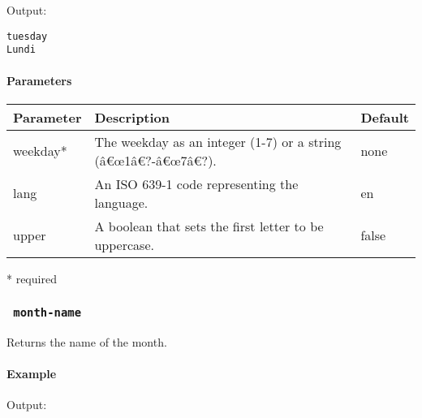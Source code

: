 Output:

\begin{verbatim}
tuesday
Lundi
\end{verbatim}

\paragraph{Parameters}\label{parameters}

\begin{Shaded}
\begin{Highlighting}[]
\end{Highlighting}
\end{Shaded}

\begin{longtable}[]{@{}lll@{}}
\toprule\noalign{}
Parameter & Description & Default \\
\midrule\noalign{}
\endhead
\bottomrule\noalign{}
\endlastfoot
weekday* & The weekday as an integer (1-7) or a string
(â€œ1â€?-â€œ7â€?). & none \\
lang & An ISO 639-1 code representing the language. & en \\
upper & A boolean that sets the first letter to be uppercase. & false \\
\end{longtable}

* required

\subsubsection{\texorpdfstring{\texttt{\ month-name\ }}{ month-name }}\label{month-name}

Returns the name of the month.

\paragraph{Example}\label{example-1}

\begin{Shaded}
\begin{Highlighting}[]

\end{Highlighting}
\end{Shaded}

Output:


